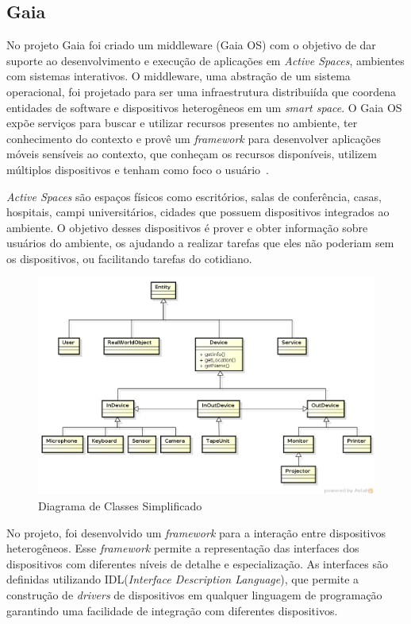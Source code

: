 \subsection{Gaia}
No projeto Gaia foi criado um middleware (Gaia OS) com o objetivo de dar suporte ao desenvolvimento e execução de aplicações em \emph{Active Spaces}, ambientes com sistemas interativos. O middleware, uma abstração de um sistema operacional, foi projetado para ser uma infraestrutura distribuiída que coordena entidades de software e dispositivos heterogêneos em um \emph{smart space}. O Gaia OS expõe serviços para buscar e utilizar recursos presentes no ambiente, ter conhecimento do contexto e provê um \emph{framework} para desenvolver aplicações móveis sensíveis ao contexto, que conheçam os recursos disponíveis, utilizem múltiplos dispositivos e tenham como foco o usuário~\cite{gaia2002}.

\emph{Active Spaces} são espaços físicos como escritórios, salas de conferência, casas, hospitais, campi universitários, cidades que possuem dispositivos integrados ao ambiente. O objetivo desses dispositivos é prover e obter informação sobre usuários do ambiente, os ajudando a realizar tarefas que eles não poderiam sem os dispositivos, ou facilitando tarefas do cotidiano.

\begin{figure}[ht]
\center
\includegraphics[scale=0.5]{imagens/gaia-devices}
\caption{Diagrama de Classes Simplificado~\cite{gaiaDevices}}
\label{fig:gaiaClassDiagram}
\end{figure}

No projeto, foi desenvolvido um \emph{framework} para a interação entre dispositivos heterogêneos. Esse \emph{framework} permite a representação das interfaces dos dispositivos com diferentes níveis de detalhe e especialização. As interfaces são definidas utilizando IDL(\emph{Interface Description Language}), que permite a construção de \emph{drivers} de dispositivos em qualquer linguagem de programação garantindo uma facilidade de integração com diferentes dispositivos.

